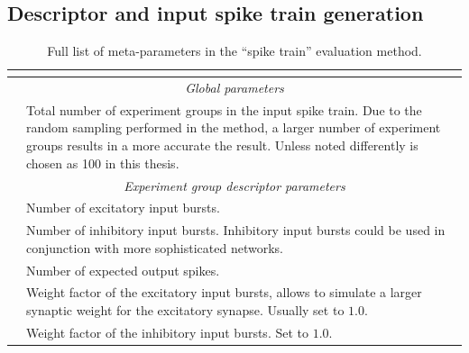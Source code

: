 \subsection{Descriptor and input spike train generation}

\begin{table}
	\centering
	\small
	\begin{tabular}{r p{10.4cm}}
		\toprule
		\multicolumn{2}{c}{\spacedlowsmallcaps{Spike Train Measure Meta-Parameters}} \\

		\midrule
		\multicolumn{2}{c}{\slshape Global parameters} \\
		\midrule
		\Ngroups & Total number of experiment groups in the input spike train. Due to the random sampling performed in the method, a larger number of experiment groups results in a more accurate the result. Unless noted differently \Ngroups is chosen as 100 in this thesis.\\[0.5em]

		\midrule
		\multicolumn{2}{c}{\slshape Experiment group descriptor parameters} \\
		\midrule

		\nE & Number of excitatory input bursts. \\[0.5em]
		\nI & Number of inhibitory input bursts. Inhibitory input bursts could be used in conjunction with more sophisticated networks.\\[0.5em]
		\nOut & Number of expected output spikes. \\[0.5em]
		\wE & Weight factor of the excitatory input bursts, allows to simulate a larger synaptic weight for the excitatory synapse. Usually set to $1.0$. \\[0.5em]
		\wI & Weight factor of the inhibitory input bursts. Set to $1.0$.\\
		\bottomrule
	\end{tabular}
	\caption[Spike train evaluation method meta-parameter list]{Full list of meta-parameters in the \enquote{spike train} evaluation method.}
	\label{tbl:spike_train_measure_meta}
\end{table}

